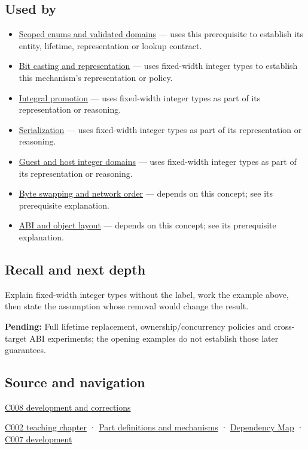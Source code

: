 \subsection{Used by}\label{appendix-cc04044b5782-used-by}

\begin{itemize}
\tightlist
\item
  \hyperref[appendix-23640fcee147]{Scoped enums and validated domains} --- uses this prerequisite to establish its entity, lifetime, representation or lookup contract.
\item
  \hyperref[appendix-34ee45f161c1]{Bit casting and representation} --- uses fixed-width integer types to establish this mechanism's representation or policy.
\item
  \hyperref[appendix-45303d03796a]{Integral promotion} --- uses fixed-width integer types as part of its representation or reasoning.
\item
  \hyperref[appendix-91d09ebed979]{Serialization} --- uses fixed-width integer types as part of its representation or reasoning.
\item
  \hyperref[appendix-33e7a011b684]{Guest and host integer domains} --- uses fixed-width integer types as part of its representation or reasoning.
\item
  \hyperref[appendix-11ba36693aa2]{Byte swapping and network order} --- depends on this concept; see its prerequisite explanation.
\item
  \hyperref[appendix-c4ac6bb0fff8]{ABI and object layout} --- depends on this concept; see its prerequisite explanation.
\end{itemize}

\subsection{Recall and next depth}\label{appendix-cc04044b5782-recall-and-next-depth}

Explain fixed-width integer types without the label, work the example above, then state the assumption whose removal would change the result.

\textbf{Pending:} Full lifetime replacement, ownership/concurrency policies and cross-target ABI experiments; the opening examples do not establish those later guarantees.

\subsection{Source and navigation}\label{appendix-cc04044b5782-source-and-navigation}

\hyperref[appendix-fd090d982a15-m008---parts-113-126]{C008 development and corrections}

\hyperref[01-foundations-i-ch001-arithmetic-becomes-a-policy]{C002 teaching chapter} · \hyperref[appendix-fd090d982a15]{Part definitions and mechanisms} · \hyperref[appendix-4ad47bdd269a]{Dependency Map} · \hyperref[01-foundations-i-ch002-choose-a-type-for-its-promise-not-its-familiar-size]{C007 development}
